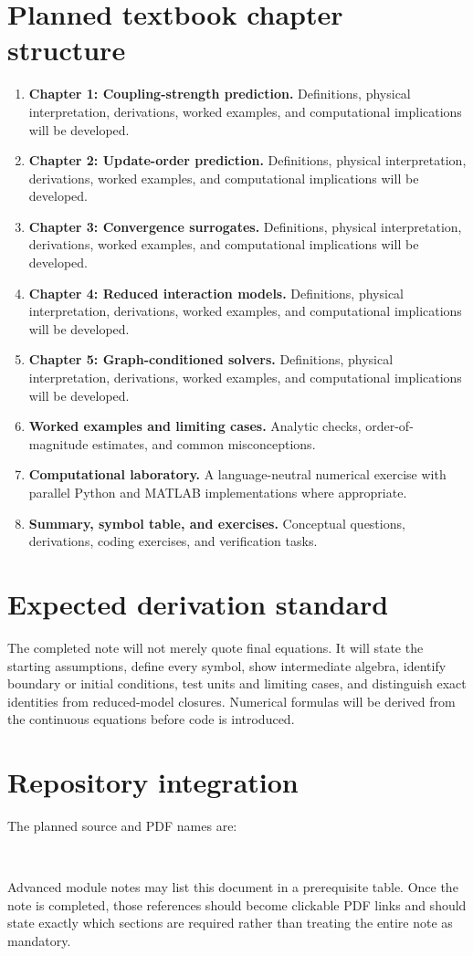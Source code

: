 \documentclass[11pt]{article}
\begin{document}
\section{Planned textbook chapter structure}
\begin{enumerate}[leftmargin=1.8em]
\item \textbf{Chapter 1: Coupling-strength prediction.} Definitions, physical interpretation, derivations, worked examples, and computational implications will be developed.
\item \textbf{Chapter 2: Update-order prediction.} Definitions, physical interpretation, derivations, worked examples, and computational implications will be developed.
\item \textbf{Chapter 3: Convergence surrogates.} Definitions, physical interpretation, derivations, worked examples, and computational implications will be developed.
\item \textbf{Chapter 4: Reduced interaction models.} Definitions, physical interpretation, derivations, worked examples, and computational implications will be developed.
\item \textbf{Chapter 5: Graph-conditioned solvers.} Definitions, physical interpretation, derivations, worked examples, and computational implications will be developed.
\item \textbf{Worked examples and limiting cases.} Analytic checks, order-of-magnitude estimates, and common misconceptions.
\item \textbf{Computational laboratory.} A language-neutral numerical exercise with parallel Python and MATLAB implementations where appropriate.
\item \textbf{Summary, symbol table, and exercises.} Conceptual questions, derivations, coding exercises, and verification tasks.
\end{enumerate}

\section{Expected derivation standard}
The completed note will not merely quote final equations. It will state the starting assumptions, define every symbol, show intermediate algebra, identify boundary or initial conditions, test units and limiting cases, and distinguish exact identities from reduced-model closures. Numerical formulas will be derived from the continuous equations before code is introduced.

\section{Repository integration}
The planned source and PDF names are:
\begin{center}
\\
\end{center}
Advanced module notes may list this document in a prerequisite table. Once the note is completed, those references should become clickable PDF links and should state exactly which sections are required rather than treating the entire note as mandatory.
\end{document}
